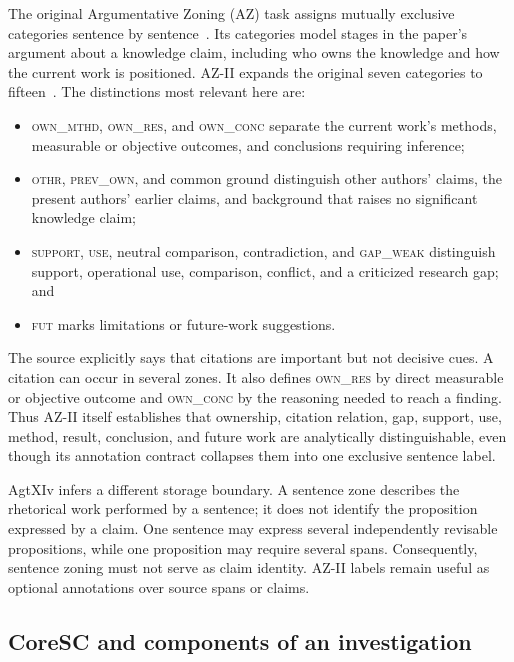 The original Argumentative Zoning (AZ) task assigns mutually exclusive categories sentence by sentence~\cite{teufel1999az}. Its categories model stages in the paper's argument about a knowledge claim, including who owns the knowledge and how the current work is positioned. AZ-II expands the original seven categories to fifteen~\cite{teufel2009azii}. The distinctions most relevant here are:
\begin{itemize}
  \item \textsc{own\_mthd}, \textsc{own\_res}, and \textsc{own\_conc} separate the current work's methods, measurable or objective outcomes, and conclusions requiring inference;
  \item \textsc{othr}, \textsc{prev\_own}, and common ground distinguish other authors' claims, the present authors' earlier claims, and background that raises no significant knowledge claim;
  \item \textsc{support}, \textsc{use}, neutral comparison, contradiction, and \textsc{gap\_weak} distinguish support, operational use, comparison, conflict, and a criticized research gap; and
  \item \textsc{fut} marks limitations or future-work suggestions.
\end{itemize}
The source explicitly says that citations are important but not decisive cues. A citation can occur in several zones. It also defines \textsc{own\_res} by direct measurable or objective outcome and \textsc{own\_conc} by the reasoning needed to reach a finding. Thus AZ-II itself establishes that ownership, citation relation, gap, support, use, method, result, conclusion, and future work are analytically distinguishable, even though its annotation contract collapses them into one exclusive sentence label.

AgtXIv infers a different storage boundary. A sentence zone describes the rhetorical work performed by a sentence; it does not identify the proposition expressed by a claim. One sentence may express several independently revisable propositions, while one proposition may require several spans. Consequently, sentence zoning must not serve as claim identity. AZ-II labels remain useful as optional annotations over source spans or claims.

\subsection{CoreSC and components of an investigation}

